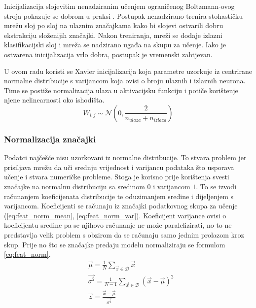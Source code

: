 \documentclass[times, utf8, numeric, diplomski]{fer}
\def\normal{\mathcal{N}}
\def\dataset{\mathcal{D}}
\def\TODO#1{\noindent\textcolor{red}{TODO: \textit{#1}}\newline}
\def\todo#1{\TODO{#1}}
\begin{document}
Inicijalizacija slojevitim nenadziranim učenjem ograničenog Boltzmann-ovog stroja  pokazuje se dobrom u praksi \citep{relu6}. Postupak nenadzirano trenira stohastičku mrežu sloj po sloj na ulaznim značajkama kako bi slojevi ostvarili dobru ekstrakciju složenijih značajki. Nakon treniranja, mreži se dodaje izlazni klasifikacijski sloj i mreža se nadzirano ugađa na skupu za učenje. Iako je ostvarena inicijalizacija vrlo dobra, postupak je vremenski zahtjevan. 


U ovom radu koristi se Xavier inicijalizacija koja parametre uzorkuje iz centrirane normalne distribucije s varijancom koja ovisi o broju ulaznih i izlaznih neurona. Time se postiže normalizacija ulaza u aktivacijsku funkciju i potiče korištenje njene nelinearnosti oko ishodišta. \citep{xavier}
\begin{equation}
W_{i,j} \sim \normal(0, \frac{2}{n_{ulaza}+n_{izlaza}})
\end{equation}

\subsubsection{Normalizacija značajki}
Podatci najčešće nisu uzorkovani iz normalne distribucije. To stvara problem jer prisiljava mrežu da uči srednju vrijednost i varijancu podataka što usporava učenje i stvara numeričke probleme. Stoga je korisno prije korištenja svesti značajke na normalnu distribuciju sa sredinom $0$ i varijancom $1$. To se izvodi računanjem koeficijenata distribucije te oduzimanjem sredine i dijeljenjem s varijancom. Koeficijenti se računaju iz značajki podatkovnog skupa za učenje (\ref{eq:feat_norm_mean}, \ref{eq:feat_norm_var}). Koeficijent varijance ovisi o koeficijentu sredine pa se njihovo računanje ne može paralelizirati, no to ne predstavlja velik problem s obzirom da se računaju samo jednim prolazom kroz skup. Prije no što se značajke predaju modelu normaliziraju se formulom \eqref{eq:feat_norm}.
\begin{align}
\label{eq:feat_norm_mean}
&\vec{\mu} = \frac{1}{N} \sum_{\vec{x}\in \dataset} \vec{x} \\
\label{eq:feat_norm_var}
&\vec{\sigma^2} = \frac{1}{N-1} \sum_{\vec{x}\in \dataset} (\vec{x}-\vec{\mu})^2 \\
\label{eq:feat_norm}
&\vec{z} = \frac{\vec{x} - \vec{\mu}}{\vec{\sigma^2}}
\end{align}
\end{document}
